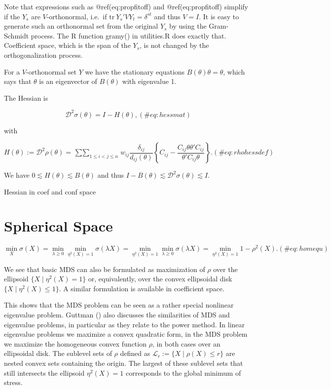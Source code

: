 \documentclass[
  12pt,
  letterpaper,
  DIV=11,
  numbers=noendperiod]{scrreprt}
\theoremstyle{remark}
\begin{document}
Note that expressions such as @ref(eq:propfitoff) and
@ref(eq:propfitoff) simplify if the \(Y_s\) are \(V\)-orthonormal,
i.e.~if \(\text{tr}\ Y_s'VY_t=\delta^{st}\) and thus \(V=I\). It is easy
to generate such an orthonormal set from the original \(Y_s\) by using
the Gram-Schmidt process. The R function gramy() in utilities.R does
exactly that. Coefficient space, which is the span of the \(Y_s\), is
not changed by the orthogonalization process.

For a \(V\)-orthonormal set \(Y\) we have the stationary equations
\(B(\theta)\theta=\theta\), which says that \(\theta\) is an eigenvector
of \(B(\theta)\) with eigenvalue 1.

The Hessian is

\begin{equation}
\mathcal{D}^2\sigma(\theta)=I-H(\theta),
(\#eq:hessmat)
\end{equation}

with

\begin{equation}
H(\theta):=\mathcal{D}^2\rho(\theta)=\mathop{\sum\sum}_{1\leq i<j\leq n}w_{ij}\frac{\delta_{ij}}{d_{ij}(\theta)}\left\{C_{ij}-\frac{C_{ij}\theta\theta'C_{ij}}{\theta'C_{ij}\theta}\right\}.
(\#eq:rhohessdef)
\end{equation}

We have \(0\lesssim H(\theta)\lesssim B(\theta)\) and thus
\(I-B(\theta)\lesssim\mathcal{D}^2\sigma(\theta)\lesssim I\).

Hessian in coef and conf space

\section{Spherical Space}\label{propspherespace}

\begin{equation}
\min_X\sigma(X)=\min_{\lambda\geq 0}\min_{\eta^2(X)=1}\sigma(\lambda X)=\min_{\eta^2(X)=1}\min_{\lambda\geq 0}\sigma(\lambda X)=
\min_{\eta^2(X)=1}1-\rho^2(X).
(\#eq:homequ)
\end{equation}

We see that basic MDS can also be formulated as maximization of \(\rho\)
over the ellipsoid \(\{X\mid \eta^2(X)=1\}\) or, equivalently, over the
convex ellipsoidal disk \(\{X\mid \eta^2(X)\leq 1\}\). A similar
formulation is available in coefficient space.

This shows that the MDS problem can be seen as a rather special
nonlinear eigenvalue problem. Guttman ()
also discusses the similarities of MDS and eigenvalue problems, in
particular as they relate to the power method. In linear eigenvalue
problems we maximize a convex quadratic form, in the MDS problem we
maximize the homogeneous convex function \(\rho\), in both cases over an
ellipsoidal disk. The sublevel sets of \(\rho\) defined as
\(\mathcal{L}_r:=\{X\mid \rho(X)\leq r\}\) are nested convex sets
containing the origin. The largest of these sublevel sets that still
intersects the ellipsoid \(\eta^2(X)=1\) corresponds to the global
minimum of stress.
\end{document}

